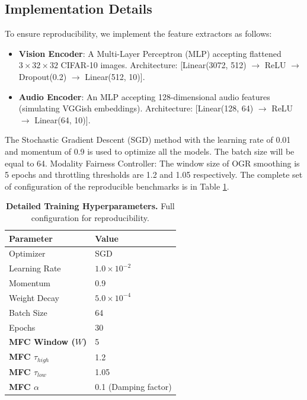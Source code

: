 \documentclass{ieeeaccess}
\begin{document}
\subsection{Implementation Details}
To ensure reproducibility, we implement the feature extractors as follows:
\begin{itemize}
    \item \textbf{Vision Encoder}: A Multi-Layer Perceptron (MLP) accepting flattened $3 \times 32 \times 32$ CIFAR-10 images. Architecture: [Linear(3072, 512) $\rightarrow$ ReLU $\rightarrow$ Dropout(0.2) $\rightarrow$ Linear(512, 10)].
    \item \textbf{Audio Encoder}: An MLP accepting 128-dimensional audio features (simulating VGGish embeddings). Architecture: [Linear(128, 64) $\rightarrow$ ReLU $\rightarrow$ Linear(64, 10)].
\end{itemize}
The Stochastic Gradient Descent (SGD) method with the learning rate of 0.01 and momentum of 0.9 is used to optimize all the models. The batch size will be equal to 64. Modality Fairness Controller: The window size of OGR smoothing is 5 epochs and throttling thresholds are 1.2 and 1.05 respectively. The complete set of configuration of the reproducible benchmarks is in Table \ref{tab:hyperparams_main}.

\begin{table}[h]
\caption{\textbf{Detailed Training Hyperparameters.} Full configuration for reproducibility.}
\label{tab:hyperparams_main}
\centering
\begin{tabular}{@{}ll@{}}
\toprule
\textbf{Parameter} & \textbf{Value} \\ \midrule
Optimizer & SGD \\
Learning Rate & $1.0 \times 10^{-2}$ \\
Momentum & 0.9 \\
Weight Decay & $5.0 \times 10^{-4}$ \\ 
Batch Size & 64 \\
Epochs & 30 \\
\textbf{MFC Window ($W$)} & 5 \\
\textbf{MFC $\tau_{high}$} & 1.2 \\
\textbf{MFC $\tau_{low}$} & 1.05 \\
\textbf{MFC $\alpha$} & 0.1 (Damping factor) \\ \bottomrule
\end{tabular}

\end{table}
\end{document}
